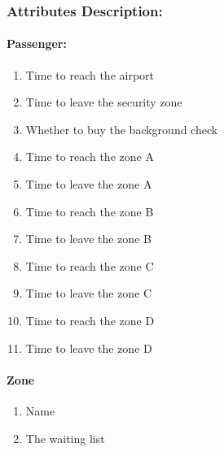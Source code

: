 \subsubsection*{Attributes Description:}
\paragraph*{Passenger:}
\begin{enumerate}
	\item Time to reach the airport
 	\item Time to leave the security zone
 	\item Whether to buy the  background check
 	\item Time to reach the zone A
 	\item Time to leave the zone A
  	\item Time to reach the zone B
 	\item Time to leave the zone B
 	\item Time to reach the zone C
 	\item Time to leave the zone C
 	\item Time to reach the zone D
 	\item Time to leave the zone D
\end{enumerate}
\paragraph*{Zone}
\begin{enumerate}
	\item Name
	\item The waiting list
\end{enumerate}

